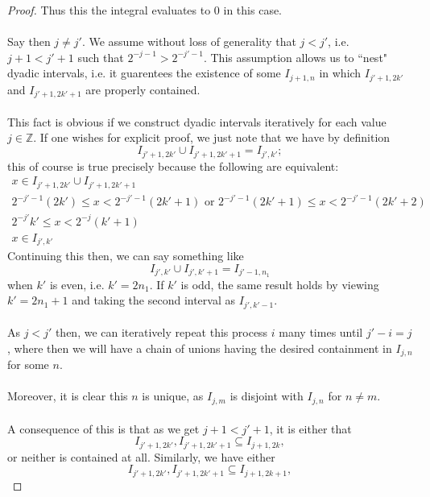 \documentclass[12pt]{article}
\newenvironment{ex}[2][Exercise]{\begin{trivlist}
\item[\hskip \labelsep {\bfseries #1}\hskip \labelsep {\bfseries #2.}]}{\end{trivlist}}
\begin{document}
\begin{ex}{14}
\begin{enumerate}[label=14.\arabic*]
\begin{proof}
            Thus this the integral evaluates to $0$ in this case. \\ \\
            Say then $j \neq j'$. We assume without loss of generality that $j < j'$, i.e. $j + 1 < j' + 1$ such that $2^{-j - 1} > 2^{- j' - 1}$. This assumption allows us to ``nest" dyadic intervals, i.e. it guarentees the existence of some $I_{j + 1,n}$ in which $I_{j' +1, 2k'}$ and $I_{j' + 1, 2k' + 1}$ are properly contained. \\ \\This fact is obvious if we construct dyadic intervals iteratively for each value $j \in \mathbb{Z}$. If one wishes for explicit proof, we just note that we have by definition
            $$I_{j' + 1, 2k'} \cup I_{j' + 1, 2k' + 1} = I_{j', k'};$$
            this of course is true precisely because the following are equivalent:
            \begin{align*}
                x \in I_{j' + 1, 2k'} \cup I_{j' + 1, 2k' + 1} \\
                2^{-j' - 1}(2k') \leq x < 2^{-j' - 1}(2k' + 1) \text{ or } 2^{-j' - 1}(2k' + 1) \leq x < 2^{-j' - 1}(2k' + 2) \\
                2^{-j'}k' \leq x < 2^{-j}(k' + 1) \\
                x \in I_{j', k'}
            \end{align*}
            Continuing this then, we can say something like
            $$I_{j', k'} \cup I_{j', k' + 1} = I_{j' - 1, n_1}$$
            when $k'$ is even, i.e. $k' = 2n_1$. If $k'$ is odd, the same result holds by viewing $k' = 2n_1 + 1$ and taking the second interval as $I_{j', k' - 1}$.\\ \\
            As $j < j'$ then, we can iteratively repeat this process $i$ many times until $j' - i = j$, where then we will have a chain of unions having the desired containment in $I_{j,n}$ for some $n$. \\ \\
            Moreover, it is clear this $n$ is unique, as $I_{j, m}$ is disjoint with $I_{j,n}$ for $n \neq m$. \\ \\
            A consequence of this is that as we get $j + 1 < j' + 1$, it is either that 
            $$I_{j' + 1, 2k'}, I_{j' + 1, 2k' + 1} \subseteq I_{j + 1, 2k},$$
            or neither is contained at all. Similarly, we have either 
            $$I_{j' + 1, 2k'}, I_{j' + 1, 2k' + 1} \subseteq I_{j + 1, 2k + 1},$$

\end{proof}
\end{enumerate}
\end{ex}
\end{document}
